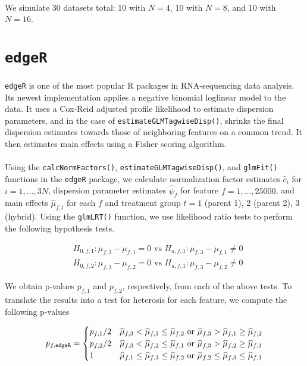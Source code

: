 \documentclass{article}
\providecommand{\wh}[1]{\widehat{#1}}
\begin{document}
\begin{flushleft}
\paragraph{} We simulate 30 datasets total: 10 with $N = 4$, 10 with $N = 8$, and 10 with $N = 16$.

\section{{\tt edgeR}}

\paragraph{} {\tt edgeR} is one of the most popular R packages in RNA-sequencing data analysis. Its newest implementation applies a negative binomial loglinear model to the data. It uses a Cox-Reid adjusted profile likelihood to estimate dispersion parameters, and in the case of {\tt estimateGLMTagwiseDisp()}, shrinks the final dispersion estimates towards those of neighboring features on a common trend. It then estimates main effects using a Fisher scoring algorithm.

\paragraph{} Using the {\tt calcNormFactors()}, {\tt estimateGLMTagwiseDisp()}, and {\tt glmFit()} functions in the {\tt edgeR} package, we calculate normalization factor estimates $\wh{c}_i$ for $i = 1, \ldots, 3N$, dispersion parameter estimates $\wh{\psi}_{f}$ for feature $f = 1, \ldots, 25000$, and main effects $\wh{\mu}_{f, t}$ for each $f$ and treatment group $t = 1$ (parent 1), 2 (parent 2), 3 (hybrid). Using the {\tt glmLRT()} function, we use likelihood ratio tests to perform the following hypothesis tests.

\begin{align*}
&H_{0, f, 1} : \mu_{f, 3} - \mu_{f, 1} = 0 \text{ vs } H_{a, f, 1}: \mu_{f, 3} - \mu_{f, 1} \ne 0 \\
&H_{0, f, 2} : \mu_{f, 3} - \mu_{f, 2} = 0 \text{ vs } H_{a, f, 1}: \mu_{f, 3} - \mu_{f, 2} \ne 0
\end{align*}

We obtain p-values $p_{f, 1}$ and $p_{f, 2}$, respectively, from each of the above tests. To translate the results into a test for heterosis for each feature, we compute the following p-values

\begin{align*}
p_{f, {\tt edgeR}} = \begin{cases}
p_{f, 1}/2 & \wh{\mu}_{f, 3} < \wh{\mu}_{f, 1} \le \wh{\mu}_{f, 2} \text{ or } \wh{\mu}_{f, 3} > \wh{\mu}_{f, 1} \ge \wh{\mu}_{f, 2} \\
p_{f, 2}/2 & \wh{\mu}_{f, 3} < \wh{\mu}_{f, 2} \le \wh{\mu}_{f, 1} \text{ or } \wh{\mu}_{f, 3} > \wh{\mu}_{f, 2} \ge \wh{\mu}_{f, 1} \\
1 & \wh{\mu}_{f, 1} \le \wh{\mu}_{f, 3} \le \wh{\mu}_{f, 2} \text{ or } \wh{\mu}_{f, 2} \le \wh{\mu}_{f, 3} \le \wh{\mu}_{f, 1}
\end{cases}
\end{align*}


\end{flushleft}
\end{document}
